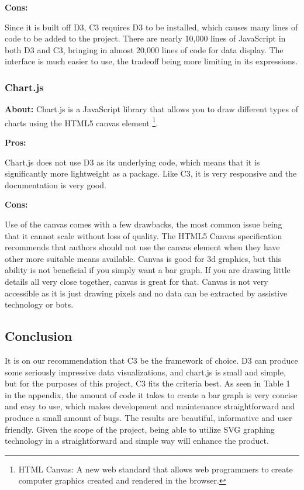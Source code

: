 \documentclass[draftclsnofoot,onecolumn,letterpaper,10pt,compsoc]{IEEEtran}
\begin{document}
    \noindent \textbf{Cons:}

    Since it is built off D3, C3 requires D3 to be installed, which causes many lines of code to be added to the project.
    There are nearly 10,000 lines of JavaScript in both D3 and C3, bringing in almost 20,000 lines of code for data display.
    The interface is much easier to use, the tradeoff being more limiting in its expressions.


    \subsubsection{Chart.js}
    \textbf{About:}
    Chart.js is a JavaScript library that allows you to draw different types of charts using the HTML5 canvas element
    \footnote{HTML Canvas: A new web standard that allows web programmers to create computer graphics created and rendered in the browser.}.

    \noindent \textbf{Pros:}

    Chart.js does not use D3 as its underlying code, which means that it is significantly more lightweight as a package.\cite{ChartJS} Like C3, it is very responsive and the documentation is very good.

    \noindent \textbf{Cons:}

    Use of the canvas comes with a few drawbacks, the most common issue being that it cannot scale without loss of quality.
    The HTML5 Canvas specification recommends that authors should not use the canvas element when they have other more suitable means available.\cite{CanvasVsSVG}
    Canvas is good for 3d graphics, but this ability is not beneficial if you simply want a bar graph.
    If you are drawing little details all very close together, canvas is great for that.
    Canvas is not very accessible as it is just drawing pixels and no data can be extracted by assistive technology or bots.

  \subsection{Conclusion}
  It is on our recommendation that C3 be the framework of choice.
  D3 can produce some seriously impressive data visualizations, and chart.js is small and simple, but for the purposes of this project, C3 fits the criteria best.
  As seen in Table 1 in the appendix, the amount of code it takes to create a bar graph is very concise and easy to use, which makes development and maintenance straightforward and produce a small amount of bugs.
  The results are beautiful, informative and user friendly.
  Given the scope of the project, being able to utilize SVG graphing technology in a straightforward and simple way will enhance the product.
\end{document}
